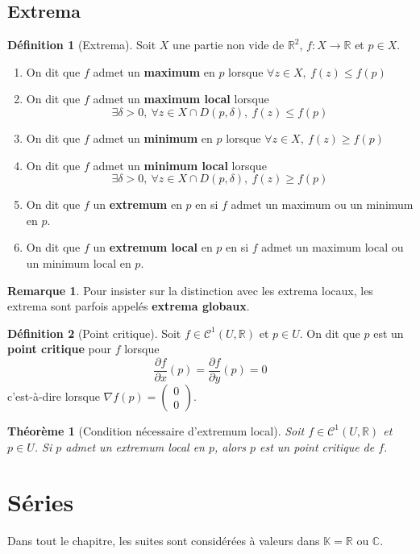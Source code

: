 \documentclass[french]{book}
\newcommand{\R}{\mathbb{R}}
\newcommand{\C}{\mathbb{C}}
\newcommand{\K}{\mathbb{K}}
\theoremstyle{plain}
\newtheorem{thm}{Théorème}[chapter]
\theoremstyle{definition}
\newtheorem{dfn}{Définition}[chapter]
\newtheorem{rmq}{Remarque}[chapter]
\theoremstyle{remark}
\begin{document}
\section{Extrema}
\begin{dfn}[Extrema]
	Soit $X$ une partie non vide de $\R^2$, $f:X\rightarrow \R$ et $p\in X$.
	\begin{enumerate}
		\item On dit que $f$ admet un \textbf{maximum} en $p$ lorsque $\forall z \in X, \ f(z)\leqslant f(p)$
		\item On dit que $f$ admet un \textbf{maximum local} lorsque $$\exists \delta>0, \ \forall z\in X\cap D(p,\delta), \ f(z)\leqslant f(p)$$
		\item On dit que $f$ admet un \textbf{minimum} en $p$ lorsque $\forall z \in X, \ f(z)\geqslant f(p)$
		\item On dit que $f$ admet un \textbf{minimum local} lorsque $$\exists \delta>0, \ \forall z\in X\cap D(p,\delta), \ f(z)\geqslant f(p)$$
		\item On dit que $f$ un \textbf{extremum} en $p$ en si $f$ admet un maximum ou un minimum en $p$.
		\item On dit que $f$ un \textbf{extremum local} en $p$ en si $f$ admet un maximum local ou un minimum local en $p$.
	\end{enumerate}
\end{dfn}
\begin{rmq} Pour insister sur la distinction avec les extrema locaux, les extrema sont parfois appelés \textbf{extrema globaux}. \end{rmq}
\begin{dfn}[Point critique]
	Soit $f\in\mathcal{C}^1(U,\R)$ et $p\in U$. On dit que $p$ est un \textbf{point critique} pour $f$ lorsque $$\frac{\partial f}{\partial x}(p)=\frac{\partial f}{\partial y}(p)=0$$ c'est-à-dire lorsque $\displaystyle \nabla f(p)=\begin{pmatrix} 0 \\ 0	\end{pmatrix}$.
\end{dfn}
\begin{thm}[Condition nécessaire d'extremum local]
	Soit $f\in\mathcal{C}^1(U,\R)$ et $p\in U$. Si $p$ admet un extremum local en $p$, alors $p$ est un point critique de $f$.
\end{thm}

\newpage
\chapter{Séries}
Dans tout le chapitre, les suites sont considérées à valeurs dans $\K=\R$ ou $\C$.
\end{document}
